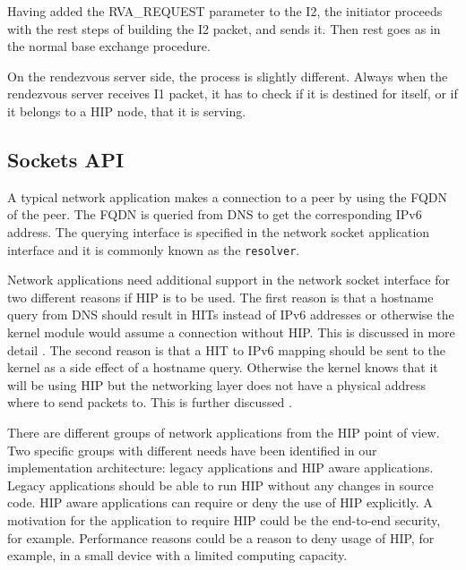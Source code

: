 Having added the RVA\_REQUEST parameter to the I2, the initiator
proceeds with the rest steps of building the I2 packet, and sends
it. Then rest goes as in the normal base exchange procedure.

On the rendezvous server side, the process is slightly
different. Always when the rendezvous server receives I1 packet, it
has to check if it is destined for itself, or if it belongs to a
\ac{HIP} node, that it is serving.


\subsection{Sockets API}
\label{sec:api_architecture}

A typical network application makes a connection to a peer by using
the \ac{FQDN} of the peer. The \ac{FQDN} is queried from \ac{DNS} to
get the corresponding IPv6 address. The querying interface is
specified in the network socket application interface and it is
commonly known as the \verb|resolver|.

Network applications need additional support in the network socket
interface for two different reasons if \ac{HIP} is to be used. The
first reason is that a hostname query from \ac{DNS} should result in
\acp{HIT} instead of IPv6 addresses or otherwise the kernel module would
assume a connection without \ac{HIP}. This is discussed in more detail
. The second reason is that a
\ac{HIT} to IPv6 mapping should be sent to the kernel as a side effect
of a hostname query. Otherwise the kernel knows that it will be using
\ac{HIP} but the networking layer does not have a physical address
where to send packets to. This is further discussed
.

There are different groups of network applications from the \ac{HIP}
point of view. Two specific groups with different needs have been
identified in our implementation architecture: legacy applications and
\ac{HIP} aware applications. Legacy applications should be able to run
\ac{HIP} without any changes in source code. \ac{HIP} aware
applications can require or deny the use of \ac{HIP} explicitly. A
motivation for the application to require \ac{HIP} could be the
end-to-end security, for example. Performance reasons could be a
reason to deny usage of \ac{HIP}, for example, in a small device with
a limited computing capacity.

